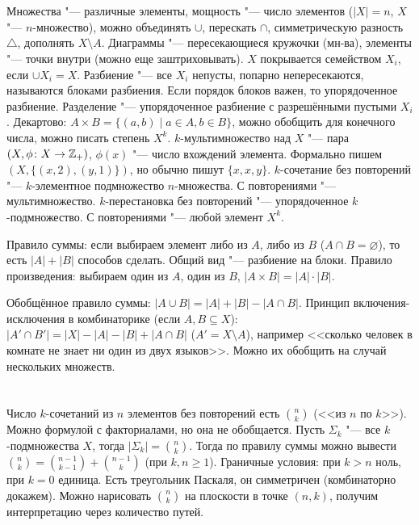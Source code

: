 \section{} %
Множества "--- различные элементы, мощность "--- число элементов ($|X|=n$, $X$ "--- $n$-множество),
можно объединять $\cup$, перескать $\cap$, симметрическую разность $\triangle$, дополнять $X \setminus A$.
Диаграммы "--- пересекающиеся кружочки (мн-ва), элементы "--- точки внутри (можно еще заштриховывать).
$X$ покрывается семейством $X_i$, если $\cup X_i=X$.
Разбиение "--- все $X_i$ непусты, попарно непересекаются, называются блоками разбиения.
Если порядок блоков важен, то упорядоченное разбиение.
Разделение "--- упорядоченное разбиение с разрешёнными пустыми $X_i$.
Декартово: $A \times B = \{(a,b) \mid a \in A, b \in B\}$, можно обобщить для конечного числа,
можно писать степень $X^{k}$.
$k$-мультимножество над $X$ "--- пара $(X, \phi \colon X \to \mathbb{Z}_{+})$,
$\phi(x)$ "--- число вхождений элемента.
Формально пишем $(X, \{(x, 2), (y, 1)\})$, но обычно пишут $\{x, x, y\}$.
$k$-сочетание без повторений "--- $k$-элементное подмножество $n$-множества.
С повторениями "--- мультимножество.
$k$-перестановка без повторений "--- упорядоченное $k$-подмножество.
С повторениями "--- любой элемент $X^{k}$.

Правило суммы: если выбираем элемент либо из $A$, либо из $B$ ($A \cap B=\varnothing$), то есть
$|A|+|B|$ способов сделать.
Общий вид "--- разбиение на блоки.
Правило произведения: выбираем один из $A$, один из $B$, $|A \times B| = |A| \cdot |B|$.

Обобщённое правило суммы: $|A\cup B|=|A|+|B|-|A\cap B|$.
Принцип включения-исключения в комбинаторике (если $A, B\subseteq X$): $|A'\cap B'|=|X|-|A|-|B|+|A\cap B|$ ($A'=X\setminus A$),
например <<сколько человек в комнате не знает ни один из двух языков>>.
Можно их обобщить на случай нескольких множеств.

\section{} %
Число $k$-сочетаний из $n$ элементов без повторений есть $\binom{n}{k}$ (<<из $n$ по $k$>>).
Можно формулой с факториалами, но она не обобщается.
Пусть $\Sigma_k$ "--- все $k$-подмножества $X$, тогда $|\Sigma_k|=\binom{n}{k}$.
Тогда по правилу суммы можно вывести $\binom{n}{k}=\binom{n-1}{k-1}+\binom{n-1}{k}$ (при $k, n \ge 1$).
Граничные условия: при $k>n$ ноль, при $k=0$ единица.
Есть треугольник Паскаля, он симметричен (комбинаторно докажем).
Можно нарисовать $\binom{n}{k}$ на плоскости в точке $(n, k)$, получим интерпретацию через количество путей.

